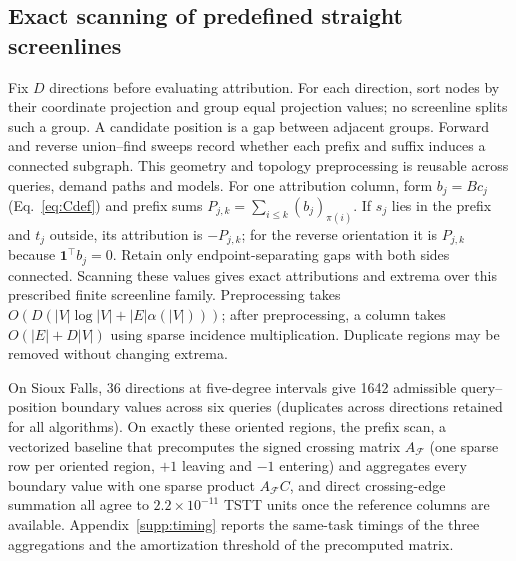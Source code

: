 \subsection{Exact scanning of predefined straight screenlines}\label{sec:scan}
Fix $D$ directions before evaluating attribution. For each direction, sort nodes by their coordinate projection and group equal projection values; no screenline splits such a group. A candidate position is a gap between adjacent groups. Forward and reverse union--find sweeps record whether each prefix and suffix induces a connected subgraph. This geometry and topology preprocessing is reusable across queries, demand paths and models.
For one attribution column, form $b_j=Bc_j$ (Eq.~\eqref{eq:Cdef}) and prefix sums $P_{j,k}=\sum_{i\leq k}(b_j)_{\pi(i)}$. If $s_j$ lies in the prefix and $t_j$ outside, its attribution is $-P_{j,k}$; for the reverse orientation it is $P_{j,k}$ because $\mathbf1^\top b_j=0$. Retain only endpoint-separating gaps with both sides connected. Scanning these values gives exact attributions and extrema over this prescribed finite screenline family. Preprocessing takes $O(D(|V|\log|V|+|E|\alpha(|V|)))$; after preprocessing, a column takes $O(|E|+D|V|)$ using sparse incidence multiplication. Duplicate regions may be removed without changing extrema.

On Sioux Falls, 36 directions at five-degree intervals give 1642 admissible query--position boundary values across six queries (duplicates across directions retained for all algorithms). On exactly these oriented regions, the prefix scan, a vectorized baseline that precomputes the signed crossing matrix $A_{\mathcal F}$ (one sparse row per oriented region, $+1$ leaving and $-1$ entering) and aggregates every boundary value with one sparse product $A_{\mathcal F}C$, and direct crossing-edge summation all agree to $2.2\times10^{-11}$ TSTT units once the reference columns are available. Appendix~\ref{supp:timing} reports the same-task timings of the three aggregations and the amortization threshold of the precomputed matrix.
